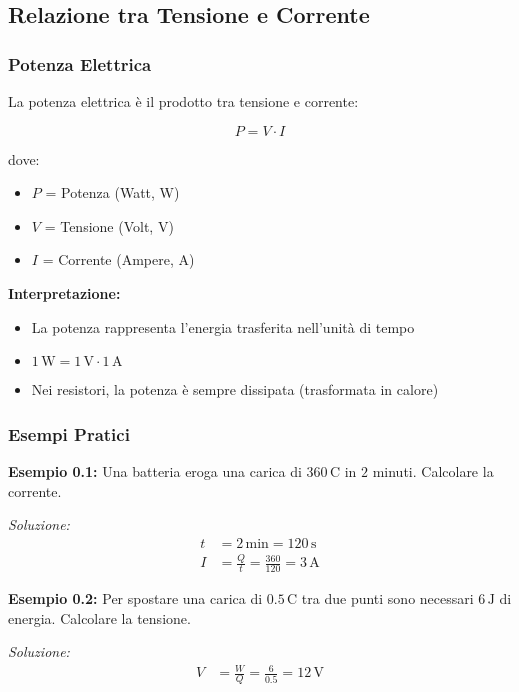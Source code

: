 \documentclass[a4paper,12pt]{article}
\begin{document}
\subsection{Relazione tra Tensione e Corrente}

\subsubsection{Potenza Elettrica}

La potenza elettrica è il prodotto tra tensione e corrente:

\begin{equation}
P = V \cdot I
\end{equation}

dove:
\begin{itemize}
    \item $P$ = Potenza (Watt, W)
    \item $V$ = Tensione (Volt, V)
    \item $I$ = Corrente (Ampere, A)
\end{itemize}

\textbf{Interpretazione:}
\begin{itemize}
    \item La potenza rappresenta l'energia trasferita nell'unità di tempo
    \item $1\,\mathrm{W} = 1\,\mathrm{V} \cdot 1\,\mathrm{A}$
    \item Nei resistori, la potenza è sempre dissipata (trasformata in calore)
\end{itemize}

\subsubsection{Esempi Pratici}

\textbf{Esempio 0.1:} Una batteria eroga una carica di $360\,\mathrm{C}$ in $2$ minuti. Calcolare la corrente.

\textit{Soluzione:}
\begin{align*}
t &= 2\,\mathrm{min} = 120\,\mathrm{s} \\
I &= \frac{Q}{t} = \frac{360}{120} = 3\,\mathrm{A}
\end{align*}

\textbf{Esempio 0.2:} Per spostare una carica di $0.5\,\mathrm{C}$ tra due punti sono necessari $6\,\mathrm{J}$ di energia. Calcolare la tensione.

\textit{Soluzione:}
\begin{align*}
V &= \frac{W}{Q} = \frac{6}{0.5} = 12\,\mathrm{V}
\end{align*}
\end{document}
